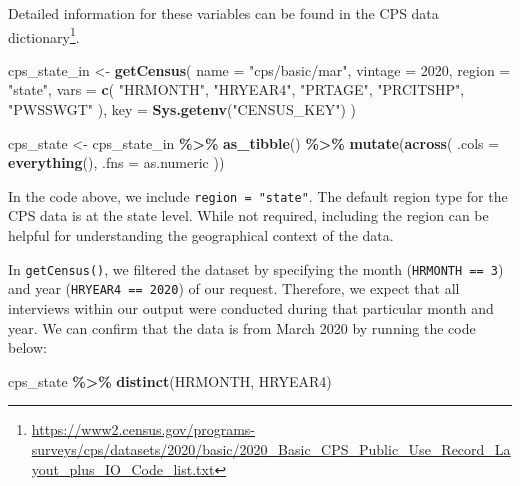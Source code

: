 \documentclass[
]{krantz}
\makeatletter
\newenvironment{Shaded}{\begin{snugshade}}{\end{snugshade}}
\newcommand{\AttributeTok}[1]{\textcolor[rgb]{0.27,0.27,0.27}{#1}}
\newcommand{\DecValTok}[1]{\textcolor[rgb]{0.06,0.06,0.06}{#1}}
\newcommand{\FunctionTok}[1]{\textcolor[rgb]{0.27,0.27,0.27}{\textbf{#1}}}
\newcommand{\NormalTok}[1]{#1}
\newcommand{\OtherTok}[1]{\textcolor[rgb]{0.37,0.37,0.37}{#1}}
\newcommand{\SpecialCharTok}[1]{\textcolor[rgb]{0.43,0.43,0.43}{\textbf{#1}}}
\newcommand{\StringTok}[1]{\textcolor[rgb]{0.5,0.5,0.5}{#1}}
\renewcommand{\href}[2]{#2\footnote{\url{#1}}}
\newenvironment{kframe}{%
\medskip{}
\setlength{\fboxsep}{.8em}
 \def\at@end@of@kframe{}%
 \ifinner\ifhmode%
  \def\at@end@of@kframe{\end{minipage}}%
  \begin{minipage}{\columnwidth}%
 \fi\fi%
 \def\FrameCommand##1{\hskip\@totalleftmargin \hskip-\fboxsep
 \colorbox{shadecolor}{##1}\hskip-\fboxsep
     \hskip-\linewidth \hskip-\@totalleftmargin \hskip\columnwidth}%
 \MakeFramed {\advance\hsize-\width
   \@totalleftmargin\z@ \linewidth\hsize
   \@setminipage}}%
 {\par\unskip\endMakeFramed%
 \at@end@of@kframe}
\renewenvironment{Shaded}{\begin{kframe}}{\end{kframe}}
\makeatother
\begin{document}
Detailed information for these variables can be found in the \href{https://www2.census.gov/programs-surveys/cps/datasets/2020/basic/2020_Basic_CPS_Public_Use_Record_Layout_plus_IO_Code_list.txt}{CPS data dictionary}.

\begin{Shaded}
\begin{Highlighting}[]
\NormalTok{cps\_state\_in }\OtherTok{\textless{}{-}} \FunctionTok{getCensus}\NormalTok{(}
  \AttributeTok{name =} \StringTok{"cps/basic/mar"}\NormalTok{,}
  \AttributeTok{vintage =} \DecValTok{2020}\NormalTok{,}
  \AttributeTok{region =} \StringTok{"state"}\NormalTok{,}
  \AttributeTok{vars =} \FunctionTok{c}\NormalTok{(}
    \StringTok{"HRMONTH"}\NormalTok{, }\StringTok{"HRYEAR4"}\NormalTok{,}
    \StringTok{"PRTAGE"}\NormalTok{, }\StringTok{"PRCITSHP"}\NormalTok{, }\StringTok{"PWSSWGT"}
\NormalTok{  ),}
  \AttributeTok{key =} \FunctionTok{Sys.getenv}\NormalTok{(}\StringTok{"CENSUS\_KEY"}\NormalTok{)}
\NormalTok{)}

\NormalTok{cps\_state }\OtherTok{\textless{}{-}}\NormalTok{ cps\_state\_in }\SpecialCharTok{\%\textgreater{}\%}
  \FunctionTok{as\_tibble}\NormalTok{() }\SpecialCharTok{\%\textgreater{}\%}
  \FunctionTok{mutate}\NormalTok{(}\FunctionTok{across}\NormalTok{(}
    \AttributeTok{.cols =} \FunctionTok{everything}\NormalTok{(),}
    \AttributeTok{.fns =}\NormalTok{ as.numeric}
\NormalTok{  ))}
\end{Highlighting}
\end{Shaded}

In the code above, we include \texttt{region\ =\ "state"}. The default region type for the CPS data is at the state level. While not required, including the region can be helpful for understanding the geographical context of the data.

In \texttt{getCensus()}, we filtered the dataset by specifying the month (\texttt{HRMONTH\ ==\ 3}) and year (\texttt{HRYEAR4\ ==\ 2020}) of our request. Therefore, we expect that all interviews within our output were conducted during that particular month and year. We can confirm that the data is from March 2020 by running the code below:

\begin{Shaded}
\begin{Highlighting}[]
\NormalTok{cps\_state }\SpecialCharTok{\%\textgreater{}\%}
  \FunctionTok{distinct}\NormalTok{(HRMONTH, HRYEAR4)}
\end{Highlighting}
\end{Shaded}
\end{document}
